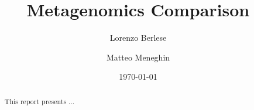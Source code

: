 \documentclass[11pt]{article}
\title{\textbf{Metagenomics Comparison}}
\author[1]{Lorenzo Berlese}
\author[1]{Matteo Meneghin}
\affil[1]{Università degli Studi di Padova}
\date{\today}
\begin{document}
\maketitle

\begin{abstract}
This report presents ... %
\end{abstract}









\end{document}
